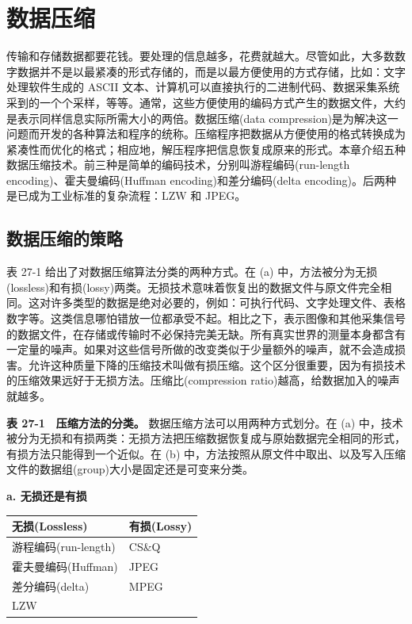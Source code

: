 
\chapter{数据压缩}\label{ch-27}

传输和存储数据都要花钱。要处理的信息越多，花费就越大。尽管如此，大多数数字数据并不是以最紧凑的形式存储的，而是以最方便使用的方式存储，比如：文字处理软件生成的
ASCII
文本、计算机可以直接执行的二进制代码、数据采集系统采到的一个个采样，等等。通常，这些方便使用的编码方式产生的数据文件，大约是表示同样信息实际所需大小的两倍。数据压缩(data
compression)是为解决这一问题而开发的各种算法和程序的统称。压缩程序把数据从方便使用的格式转换成为紧凑性而优化的格式；相应地，解压程序把信息恢复成原来的形式。本章介绍五种数据压缩技术。前三种是简单的编码技术，分别叫游程编码(run-length
encoding)、霍夫曼编码(Huffman encoding)和差分编码(delta
encoding)。后两种是已成为工业标准的复杂流程：LZW 和 JPEG。

\section{数据压缩的策略}

表 27-1 给出了对数据压缩算法分类的两种方式。在 (a)
中，方法被分为无损(lossless)和有损(lossy)两类。无损技术意味着恢复出的数据文件与原文件完全相同。这对许多类型的数据是绝对必要的，例如：可执行代码、文字处理文件、表格数字等。这类信息哪怕错放一位都承受不起。相比之下，表示图像和其他采集信号的数据文件，在存储或传输时不必保持完美无缺。所有真实世界的测量本身都含有一定量的噪声。如果对这些信号所做的改变类似于少量额外的噪声，就不会造成损害。允许这种质量下降的压缩技术叫做有损压缩。这个区分很重要，因为有损技术的压缩效果远好于无损方法。压缩比(compression
ratio)越高，给数据加入的噪声就越多。

\textbf{表 27-1　压缩方法的分类。} 数据压缩方法可以用两种方式划分。在
(a)
中，技术被分为无损和有损两类：无损方法把压缩数据恢复成与原始数据完全相同的形式，有损方法只能得到一个近似。在
(b)
中，方法按照从原文件中取出、以及写入压缩文件的数据组(group)大小是固定还是可变来分类。

\textbf{a. 无损还是有损}

{\def\LTcaptype{none} %
\begin{longtable}[]{@{}ll@{}}
\toprule\noalign{}
无损(Lossless) & 有损(Lossy) \\
\midrule\noalign{}
\endhead
\bottomrule\noalign{}
\endlastfoot
游程编码(run-length) & CS\&Q \\
霍夫曼编码(Huffman) & JPEG \\
差分编码(delta) & MPEG \\
LZW & \\
\end{longtable}
}

